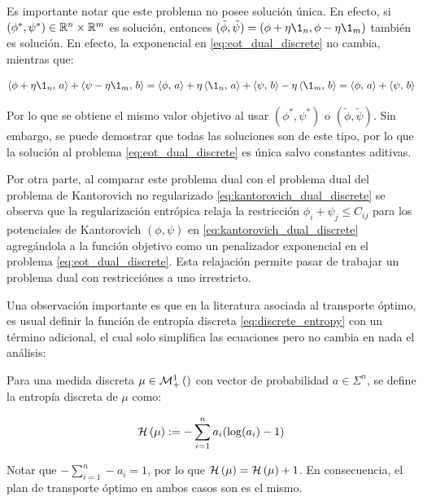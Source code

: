 Es importante notar que este problema no posee solución única. En efecto, si $(\phi^*,\psi^*)\in\mathbb{R}^n\times\mathbb{R}^m$ es solución, entonces $(\tilde{\phi},\tilde{\psi}) = (\phi + \eta\1_n, \phi - \eta\1_m)$ también es solución. En efecto, la exponencial en \eqref{eq:eot_dual_discrete} no cambia, mientras que:

\begin{equation}
	\dotproduct{\phi + \eta\1_n}{a} + \dotproduct{\psi - \eta\1_m}{b}
	= \dotproduct{\phi}{a} + \eta\dotproduct{\1_n}{a} + \dotproduct{\psi}{b} - \eta\dotproduct{\1_m}{b}
	= \dotproduct{\phi}{a} + \dotproduct{\psi}{b}
\end{equation}

Por lo que se obtiene el mismo valor objetivo al usar $(\phi^*,\psi^*)$ o $(\tilde{\phi},\tilde{\psi})$. Sin embargo, se puede demostrar que todas las soluciones son de este tipo, por lo que la solución al problema \eqref{eq:eot_dual_discrete} es única salvo constantes aditivas.

Por otra parte, al comparar este problema dual con el problema dual del problema de Kantorovich no regularizado \eqref{eq:kantorovich_dual_discrete} se observa que la regularización entrópica relaja la restricción $\phi_i+\psi_j \leq C_{ij}$ para los potenciales de Kantorovich $(\phi,\psi)$ en \eqref{eq:kantorovich_dual_discrete} agregándola a la función objetivo como un penalizador exponencial en el problema \eqref{eq:eot_dual_discrete}. Esta relajación permite pasar de trabajar un problema dual con restricciónes a uno irrestricto.

Una observación importante es que en la literatura asociada al transporte óptimo, es usual definir la función de entropía discreta \eqref{eq:discrete_entropy} con un término adicional, el cual solo simplifica las ecuaciones pero no cambia en nada el análisis:

\begin{defn}
	Para una medida discreta $\mu\in\mathcal{M}_+^1\left(\right)$ con vector de probabilidad $a\in\Sigma^n$, se define la entropía discreta de $\mu$ como:

	\begin{equation}
		\mathcal{H}\left(\mu\right) := - \sum_{i=1}^n a_i(\log(a_i)-1)
	\end{equation}
\end{defn}

Notar que $-\sum_{i=1}^n -a_i = 1$, por lo que $\mathcal{H}\left(\mu\right) = \mathcal{H}\left(\mu\right) + 1$. En consecuencia, el plan de transporte óptimo en ambos casos son es el mismo.

